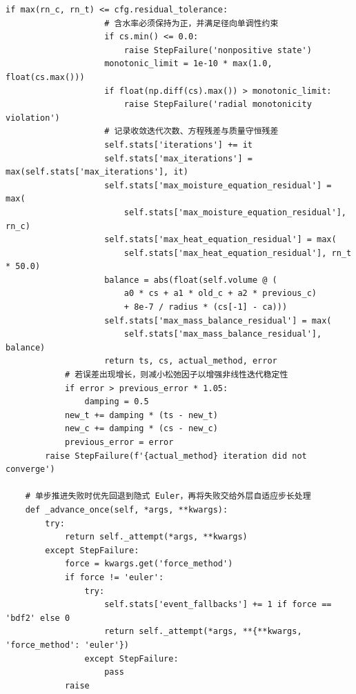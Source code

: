 \begin{Verbatim}[fontsize=\scriptsize,breaklines=true,breakanywhere=true]
                if max(rn_c, rn_t) <= cfg.residual_tolerance:
                    # 含水率必须保持为正，并满足径向单调性约束
                    if cs.min() <= 0.0:
                        raise StepFailure('nonpositive state')
                    monotonic_limit = 1e-10 * max(1.0, float(cs.max()))
                    if float(np.diff(cs).max()) > monotonic_limit:
                        raise StepFailure('radial monotonicity violation')
                    # 记录收敛迭代次数、方程残差与质量守恒残差
                    self.stats['iterations'] += it
                    self.stats['max_iterations'] = max(self.stats['max_iterations'], it)
                    self.stats['max_moisture_equation_residual'] = max(
                        self.stats['max_moisture_equation_residual'], rn_c)
                    self.stats['max_heat_equation_residual'] = max(
                        self.stats['max_heat_equation_residual'], rn_t * 50.0)
                    balance = abs(float(self.volume @ (
                        a0 * cs + a1 * old_c + a2 * previous_c)
                        + 8e-7 / radius * (cs[-1] - ca)))
                    self.stats['max_mass_balance_residual'] = max(
                        self.stats['max_mass_balance_residual'], balance)
                    return ts, cs, actual_method, error
            # 若误差出现增长，则减小松弛因子以增强非线性迭代稳定性
            if error > previous_error * 1.05:
                damping = 0.5
            new_t += damping * (ts - new_t)
            new_c += damping * (cs - new_c)
            previous_error = error
        raise StepFailure(f'{actual_method} iteration did not converge')

    # 单步推进失败时优先回退到隐式 Euler，再将失败交给外层自适应步长处理
    def _advance_once(self, *args, **kwargs):
        try:
            return self._attempt(*args, **kwargs)
        except StepFailure:
            force = kwargs.get('force_method')
            if force != 'euler':
                try:
                    self.stats['event_fallbacks'] += 1 if force == 'bdf2' else 0
                    return self._attempt(*args, **{**kwargs, 'force_method': 'euler'})
                except StepFailure:
                    pass
            raise



\end{Verbatim}
